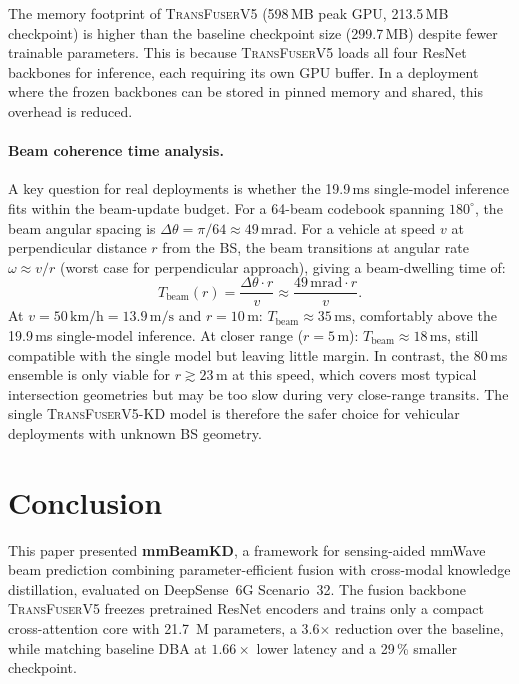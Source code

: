 \documentclass[journal,10pt,twoside]{IEEEtran}
\newcommand{\ours}{\textsc{TransFuserV5}}
\newcommand{\distill}{\textsc{TransFuserV5-KD}}
\begin{document}
The memory footprint of \ours{} (598\,MB peak GPU, 213.5\,MB checkpoint) is
higher than the baseline checkpoint size (299.7\,MB) despite fewer trainable
parameters. This is because \ours{} loads all four ResNet backbones for
inference, each requiring its own GPU buffer. In a deployment where the frozen
backbones can be stored in pinned memory and shared, this overhead is reduced.

\paragraph{Beam coherence time analysis.}
A key question for real deployments is whether the 19.9\,ms single-model
inference fits within the beam-update budget. For a 64-beam codebook spanning
$180^\circ$, the beam angular spacing is $\Delta\theta = \pi/64 \approx 49\,\mathrm{mrad}$.
For a vehicle at speed $v$ at perpendicular distance $r$ from the BS,
the beam transitions at angular rate $\omega \approx v/r$ (worst case for
perpendicular approach), giving a beam-dwelling time of:
\begin{equation}
  T_{\mathrm{beam}}(r) = \frac{\Delta\theta \cdot r}{v}
    \approx \frac{49\,\mathrm{mrad}\cdot r}{v}.
  \label{eq:tbeam}
\end{equation}
At $v = 50\,\mathrm{km/h} = 13.9\,\mathrm{m/s}$ and $r = 10\,\mathrm{m}$:
$T_{\mathrm{beam}} \approx 35\,\mathrm{ms}$, comfortably above the 19.9\,ms
single-model inference. At closer range ($r = 5\,\mathrm{m}$): $T_{\mathrm{beam}} \approx 18\,\mathrm{ms}$,
still compatible with the single model but leaving little margin.
In contrast, the 80\,ms ensemble is only viable for $r \gtrsim 23\,\mathrm{m}$
at this speed, which covers most typical intersection geometries but may be
too slow during very close-range transits. The single \distill{} model is
therefore the safer choice for vehicular deployments with unknown BS geometry.

\section{Conclusion}
\label{sec:conclusion}

This paper presented \textbf{mmBeamKD}, a framework for sensing-aided mmWave beam
prediction combining parameter-efficient fusion with cross-modal knowledge
distillation, evaluated on DeepSense~6G Scenario~32.
The fusion backbone \ours{} freezes pretrained ResNet encoders and trains only a
compact cross-attention core with 21.7~M parameters, a 3.6$\times$ reduction over the baseline, while matching baseline DBA at $1.66\times$ lower latency
and a 29\,\% smaller checkpoint.
\end{document}
